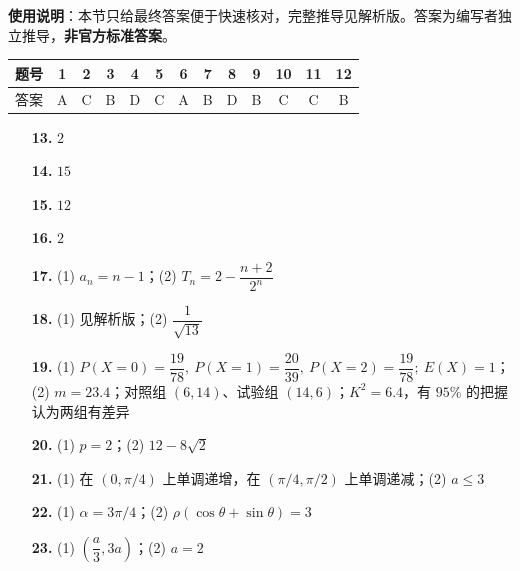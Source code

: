 
\begin{gknotice}
\textbf{使用说明}：本节只给最终答案便于快速核对，完整推导见解析版。答案为编写者独立推导，\textbf{非官方标准答案}。
\end{gknotice}

\begin{center}\begin{tabular}{ccccccccccccc}
\toprule
题号 & 1 & 2 & 3 & 4 & 5 & 6 & 7 & 8 & 9 & 10 & 11 & 12 \\
\midrule
答案 & A & C & B & D & C & A & B & D & B & C & C & B \\
\bottomrule
\end{tabular}\end{center}

\begin{itemize}[leftmargin=2.6em]
  \item[\textbf{13.}] $2$
  \item[\textbf{14.}] $15$
  \item[\textbf{15.}] $12$
  \item[\textbf{16.}] $2$
\end{itemize}

\begin{itemize}[leftmargin=2.6em]
  \item[\textbf{17.}] (1) $a_n=n-1$；(2) $T_n=2-\dfrac{n+2}{2^n}$
  \item[\textbf{18.}] (1) 见解析版；(2) $\dfrac1{\sqrt{13}}$
  \item[\textbf{19.}] (1) $P(X=0)=\dfrac{19}{78},\ P(X=1)=\dfrac{20}{39},\ P(X=2)=\dfrac{19}{78};\ E(X)=1$；(2) $m=23.4$；对照组 $(6,14)$、试验组 $(14,6)$；$K^2=6.4$，有 $95\%$ 的把握认为两组有差异
  \item[\textbf{20.}] (1) $p=2$；(2) $12-8\sqrt2$
  \item[\textbf{21.}] (1) 在 $(0,\pi/4)$ 上单调递增，在 $(\pi/4,\pi/2)$ 上单调递减；(2) $a\leqslant3$
\end{itemize}

\begin{itemize}[leftmargin=2.6em]
  \item[\textbf{22.}] (1) $\alpha=3\pi/4$；(2) $\rho(\cos\theta+\sin\theta)=3$
  \item[\textbf{23.}] (1) $\left(\dfrac a3,3a\right)$；(2) $a=2$
\end{itemize}

